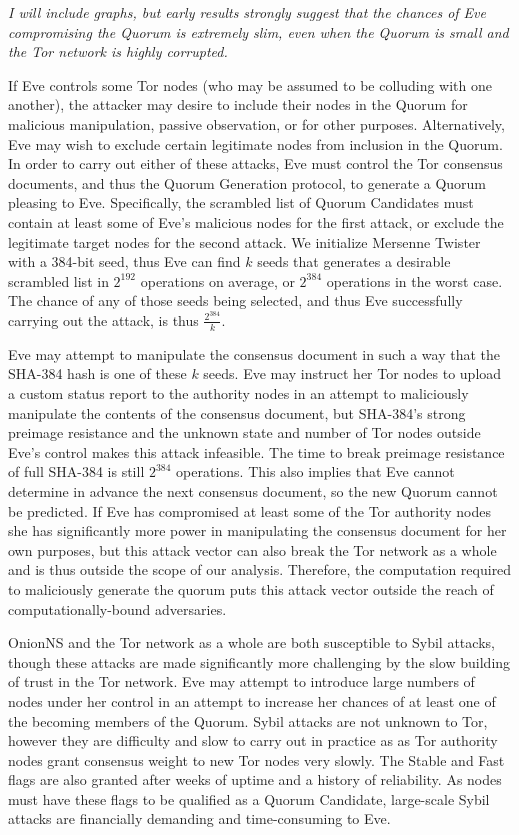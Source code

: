 \emph{I will include graphs, but early results strongly suggest that the chances of Eve compromising the Quorum is extremely slim, even when the Quorum is small and the Tor network is highly corrupted.}

If Eve controls some Tor nodes (who may be assumed to be colluding with one another), the attacker may desire to include their nodes in the Quorum for malicious manipulation, passive observation, or for other purposes. Alternatively, Eve may wish to exclude certain legitimate nodes from inclusion in the Quorum. In order to carry out either of these attacks, Eve must control the Tor consensus documents, and thus the Quorum Generation protocol, to generate a Quorum pleasing to Eve. Specifically, the scrambled list of Quorum Candidates must contain at least some of Eve's malicious nodes for the first attack, or exclude the legitimate target nodes for the second attack. We initialize Mersenne Twister with a 384-bit seed, thus Eve can find $ k $ seeds that generates a desirable scrambled list in $ 2^{192} $ operations on average, or $ 2^{384} $ operations in the worst case. The chance of any of those seeds being selected, and thus Eve successfully carrying out the attack, is thus $ \frac{2^{384}}{k} $.

Eve may attempt to manipulate the consensus document in such a way that the SHA-384 hash is one of these $ k $ seeds. Eve may instruct her Tor nodes to upload a custom status report to the authority nodes in an attempt to maliciously manipulate the contents of the consensus document, but SHA-384's strong preimage resistance and the unknown state and number of Tor nodes outside Eve's control makes this attack infeasible. The time to break preimage resistance of full SHA-384 is still $ 2^{384} $ operations. This also implies that Eve cannot determine in advance the next consensus document, so the new Quorum cannot be predicted. If Eve has compromised at least some of the Tor authority nodes she has significantly more power in manipulating the consensus document for her own purposes, but this attack vector can also break the Tor network as a whole and is thus outside the scope of our analysis. Therefore, the computation required to maliciously generate the quorum puts this attack vector outside the reach of computationally-bound adversaries.

OnionNS and the Tor network as a whole are both susceptible to Sybil attacks, though these attacks are made significantly more challenging by the slow building of trust in the Tor network. Eve may attempt to introduce large numbers of nodes under her control in an attempt to increase her chances of at least one of the becoming members of the Quorum. Sybil attacks are not unknown to Tor, however they are difficulty and slow to carry out in practice as as Tor authority nodes grant consensus weight to new Tor nodes very slowly. The Stable and Fast flags are also granted after weeks of uptime and a history of reliability. As nodes must have these flags to be qualified as a Quorum Candidate, large-scale Sybil attacks are financially demanding and time-consuming to Eve.

